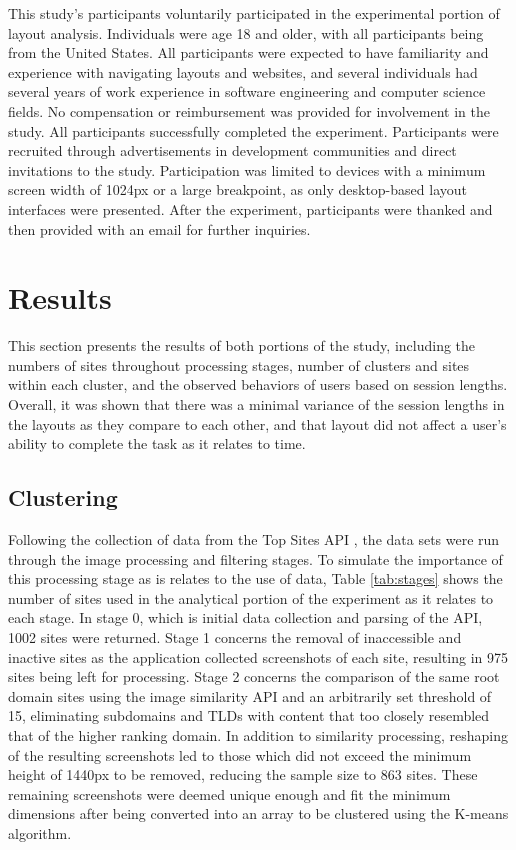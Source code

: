 \documentclass[conference]{IEEEtran}
\begin{document}
This study's participants voluntarily participated in the experimental portion of layout analysis. Individuals were age 18 and older, with all participants being from the United States. All participants were expected to have familiarity and experience with navigating layouts and websites, and several individuals had several years of work experience in software engineering and computer science fields. No compensation or reimbursement was provided for involvement in the study. All participants successfully completed the experiment. Participants were recruited through advertisements in development communities and direct invitations to the study. Participation was limited to devices with a minimum screen width of 1024px or a large breakpoint, as only desktop-based layout interfaces were presented. After the experiment, participants were thanked and then provided with an email for further inquiries.

\section{Results}

This section presents the results of both portions of the study, including the numbers of sites throughout processing stages, number of clusters and sites within each cluster, and the observed behaviors of users based on session lengths. Overall, it was shown that there was a minimal variance of the session lengths in the layouts as they compare to each other, and that layout did not affect a user's ability to complete the task as it relates to time.

\subsection{Clustering}

Following the collection of data from the Top Sites API \cite{antoniou_2015}, the data sets were run through the image processing and filtering stages. To simulate the importance of this processing stage as is relates to the use of data, Table \ref{tab:stages} shows the number of sites used in the analytical portion of the experiment as it relates to each stage. In stage 0, which is initial data collection and parsing of the API, 1002 sites were returned. Stage 1 concerns the removal of inaccessible and inactive sites as the application collected screenshots of each site, resulting in 975 sites being left for processing. Stage 2 concerns the comparison of the same root domain sites using the image similarity API \cite{deepai} and an arbitrarily set threshold of 15, eliminating subdomains and TLDs with content that too closely resembled that of the higher ranking domain. In addition to similarity processing, reshaping of the resulting screenshots led to those which did not exceed the minimum height of 1440px to be removed, reducing the sample size to 863 sites. These remaining screenshots were deemed unique enough and fit the minimum dimensions after being converted into an array to be clustered using the K-means algorithm.
\end{document}
